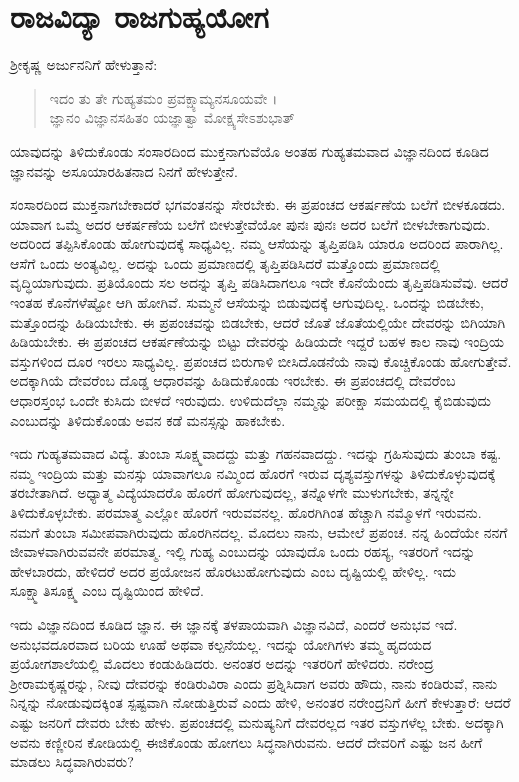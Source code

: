 
\chapter{ರಾಜವಿದ್ಯಾ ರಾಜಗುಹ್ಯಯೋಗ}

ಶ್ರೀಕೃಷ್ಣ ಅರ್ಜುನನಿಗೆ ಹೇಳುತ್ತಾನೆ:

\begin{verse}
ಇದಂ ತು ತೇ ಗುಹ್ಯತಮಂ ಪ್ರವಕ್ಷ್ಯಾಮ್ಯನಸೂಯವೇ ।\\ಜ್ಞಾನಂ ವಿಜ್ಞಾನಸಹಿತಂ ಯಜ್ಞಾತ್ವಾ ಮೋಕ್ಷ್ಯಸೇಽಶುಭಾತ್ 
\end{verse}

{\small ಯಾವುದನ್ನು ತಿಳಿದುಕೊಂಡು ಸಂಸಾರದಿಂದ ಮುಕ್ತನಾಗುವೆಯೊ ಅಂತಹ ಗುಹ್ಯತಮವಾದ ವಿಜ್ಞಾನದಿಂದ ಕೂಡಿದ ಜ್ಞಾನವನ್ನು ಅಸೂಯಾರಹಿತನಾದ ನಿನಗೆ ಹೇಳುತ್ತೇನೆ.}

ಸಂಸಾರದಿಂದ ಮುಕ್ತನಾಗಬೇಕಾದರೆ ಭಗವಂತನನ್ನು ಸೇರಬೇಕು. ಈ ಪ್ರಪಂಚದ ಆಕರ್ಷಣೆಯ ಬಲೆಗೆ ಬೀಳಕೂಡದು. ಯಾವಾಗ ಒಮ್ಮೆ ಅದರ ಆಕರ್ಷಣೆಯ ಬಲೆಗೆ ಬೀಳುತ್ತೇವೆಯೋ ಪುನಃ ಪುನಃ ಅದರ ಬಲೆಗೆ ಬೀಳಬೇಕಾಗುವುದು. ಅದರಿಂದ ತಪ್ಪಿಸಿಕೊಂಡು ಹೋಗುವುದಕ್ಕೆ ಸಾಧ್ಯವಿಲ್ಲ. ನಮ್ಮ ಆಸೆಯನ್ನು ತೃಪ್ತಿಪಡಿಸಿ ಯಾರೂ ಅದರಿಂದ ಪಾರಾಗಿಲ್ಲ. ಆಸೆಗೆ ಒಂದು ಅಂತ್ಯವಿಲ್ಲ. ಅದನ್ನು ಒಂದು ಪ್ರಮಾಣದಲ್ಲಿ ತೃಪ್ತಿಪಡಿಸಿದರೆ ಮತ್ತೊಂದು ಪ್ರಮಾಣದಲ್ಲಿ ವೃದ್ಧಿಯಾಗುವುದು. ಪ್ರತಿಯೊಂದು ಸಲ ಅದನ್ನು ತೃಪ್ತಿ ಪಡಿಸಿದಾಗಲೂ ಇದೇ ಕೊನೆಯೆಂದು ತೃಪ್ತಿಪಡಿಸುವೆವು. ಆದರೆ ಇಂತಹ ಕೊನೆಗಳೆಷ್ಟೋ ಆಗಿ ಹೋಗಿವೆ. ಸುಮ್ಮನೆ ಆಸೆಯನ್ನು ಬಿಡುವುದಕ್ಕೆ ಆಗುವುದಿಲ್ಲ. ಒಂದನ್ನು ಬಿಡಬೇಕು, ಮತ್ತೊಂದನ್ನು ಹಿಡಿಯಬೇಕು. ಈ ಪ್ರಪಂಚವನ್ನು ಬಿಡಬೇಕು, ಆದರೆ ಜೊತೆ ಜೊತೆಯಲ್ಲಿಯೇ ದೇವರನ್ನು ಬಿಗಿಯಾಗಿ ಹಿಡಿಯಬೇಕು. ಈ ಪ್ರಪಂಚದ ಆಕರ್ಷಣೆಯನ್ನು ಬಿಟ್ಟು ದೇವರನ್ನು ಹಿಡಿಯದೇ ಇದ್ದರೆ ಬಹಳ ಕಾಲ ನಾವು ಇಂದ್ರಿಯ ವಸ್ತುಗಳಿಂದ ದೂರ ಇರಲು ಸಾಧ್ಯವಿಲ್ಲ. ಪ್ರಪಂಚದ ಬಿರುಗಾಳಿ ಬೀಸಿದೊಡನೆಯೆ ನಾವು ಕೊಚ್ಚಿಕೊಂಡು ಹೋಗುತ್ತೇವೆ. ಅದಕ್ಕಾಗಿಯೆ ದೇವರೆಂಬ ದೊಡ್ಡ ಆಧಾರವನ್ನು ಹಿಡಿದುಕೊಂಡು ಇರಬೇಕು. ಈ ಪ್ರಪಂಚದಲ್ಲಿ ದೇವರೆಂಬ ಆಧಾರಸ್ತಂಭ ಒಂದೇ ಕುಸಿದು ಬೀಳದೆ ಇರುವುದು. ಉಳಿದುದೆಲ್ಲಾ ನಮ್ಮನ್ನು ಪರೀಕ್ಷಾ ಸಮಯದಲ್ಲಿ ಕೈಬಿಡುವುದು ಎಂಬುದನ್ನು ತಿಳಿದುಕೊಂಡು ಅವನ ಕಡೆ ಮನಸ್ಸನ್ನು ಹಾಕಬೇಕು.

ಇದು ಗುಹ್ಯತಮವಾದ ವಿದ್ಯೆ. ತುಂಬಾ ಸೂಕ್ಷ್ಮವಾದದ್ದು ಮತ್ತು ಗಹನವಾದದ್ದು. ಇದನ್ನು ಗ್ರಹಿಸುವುದು ತುಂಬಾ ಕಷ್ಟ. ನಮ್ಮ ಇಂದ್ರಿಯ ಮತ್ತು ಮನಸ್ಸು ಯಾವಾಗಲೂ ನಮ್ಮಿಂದ ಹೊರಗೆ ಇರುವ ದೃಶ್ಯವಸ್ತುಗಳನ್ನು ತಿಳಿದುಕೊಳ್ಳುವುದಕ್ಕೆ ತರಬೇತಾಗಿದೆ. ಅಧ್ಯಾತ್ಮ ವಿದ್ಯೆಯಾದರೊ ಹೊರಗೆ ಹೋಗುವುದಲ್ಲ, ತನ್ನೊಳಗೇ ಮುಳುಗಬೇಕು, ತನ್ನನ್ನೇ ತಿಳಿದುಕೊಳ್ಳಬೇಕು. ಪರಮಾತ್ಮ ಎಲ್ಲೋ ಹೊರಗೆ ಇರುವವನಲ್ಲ. ಹೊರಗಿಗಿಂತ ಹೆಚ್ಚಾಗಿ ನಮ್ಮೊಳಗೆ ಇರುವನು. ನಮಗೆ ತುಂಬಾ ಸಮೀಪವಾಗಿರುವುದು ಹೊರಗಿನದಲ್ಲ. ಮೊದಲು ನಾನು, ಆಮೇಲೆ ಪ್ರಪಂಚ. ನನ್ನ ಹಿಂದೆಯೇ ನನಗೆ ಜೀವಾಳವಾಗಿರುವವನೇ ಪರಮಾತ್ಮ. ಇಲ್ಲಿ ಗುಹ್ಯ ಎಂಬುದನ್ನು ಯಾವುದೊ ಒಂದು ರಹಸ್ಯ, ಇತರರಿಗೆ ಇದನ್ನು ಹೇಳಬಾರದು, ಹೇಳಿದರೆ ಅದರ ಪ್ರಯೋಜನ ಹೊರಟುಹೋಗುವುದು ಎಂಬ ದೃಷ್ಟಿಯಲ್ಲಿ ಹೇಳಿಲ್ಲ. ಇದು ಸೂಕ್ಷ್ಮಾತಿಸೂಕ್ಷ್ಮ ಎಂಬ ದೃಷ್ಟಿಯಿಂದ ಹೇಳಿದೆ.

ಇದು ವಿಜ್ಞಾನದಿಂದ ಕೂಡಿದ ಜ್ಞಾನ. ಈ ಜ್ಞಾನಕ್ಕೆ ತಳಪಾಯವಾಗಿ ವಿಜ್ಞಾನವಿದೆ, ಎಂದರೆ ಅನುಭವ ಇದೆ. ಅನುಭವದೂರವಾದ ಬರಿಯ ಊಹೆ ಅಥವಾ ಕಲ್ಪನೆಯಲ್ಲ. ಇದನ್ನು ಯೋಗಿಗಳು ತಮ್ಮ ಹೃದಯದ ಪ್ರಯೋಗಶಾಲೆಯಲ್ಲಿ ಮೊದಲು ಕಂಡುಹಿಡಿದರು. ಅನಂತರ ಅದನ್ನು ಇತರರಿಗೆ ಹೇಳಿದರು. ನರೇಂದ್ರ ಶ್ರೀರಾಮಕೃಷ್ಣರನ್ನು, ನೀವು ದೇವರನ್ನು ಕಂಡಿರುವಿರಾ ಎಂದು ಪ್ರಶ್ನಿಸಿದಾಗ ಅವರು ಹೌದು, ನಾನು ಕಂಡಿರುವೆ, ನಾನು ನಿನ್ನನ್ನು ನೋಡುವುದಕ್ಕಿಂತ ಸ್ಪಷ್ಟವಾಗಿ ನೋಡುತ್ತಿರುವೆ ಎಂದು ಹೇಳಿ, ಅನಂತರ ನರೇಂದ್ರನಿಗೆ ಹೀಗೆ ಕೇಳುತ್ತಾರೆ: ಆದರೆ ಎಷ್ಟು ಜನರಿಗೆ ದೇವರು ಬೇಕು ಹೇಳು. ಪ್ರಪಂಚದಲ್ಲಿ ಮನುಷ್ಯನಿಗೆ ದೇವರಲ್ಲದ ಇತರ ವಸ್ತುಗಳೆಲ್ಲ ಬೇಕು. ಅದಕ್ಕಾಗಿ ಅವನು ಕಣ್ಣೀರಿನ ಕೋಡಿಯಲ್ಲಿ ಈಜಿಕೊಂಡು ಹೋಗಲು ಸಿದ್ಧನಾಗಿರುವನು. ಆದರೆ ದೇವರಿಗೆ ಎಷ್ಟು ಜನ ಹೀಗೆ ಮಾಡಲು ಸಿದ್ಧವಾಗಿರುವರು?

